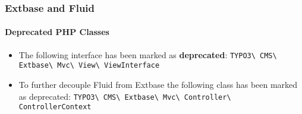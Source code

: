 %

\begin{frame}[fragile]
	\frametitle{Extbase and Fluid}
	\framesubtitle{Deprecated PHP Classes}


	\begin{itemize}
		\item The following interface has been marked as \textbf{deprecated}:\newline
			\small\texttt{TYPO3\textbackslash
				CMS\textbackslash
				Extbase\textbackslash
				Mvc\textbackslash
				View\textbackslash
				ViewInterface}\normalsize
		\item To further decouple Fluid from Extbase the following class has
			been marked as deprecated:\newline
			\small\texttt{TYPO3\textbackslash
				CMS\textbackslash
				Extbase\textbackslash
				Mvc\textbackslash
				Controller\textbackslash
				ControllerContext}\normalsize
	\end{itemize}

\end{frame}

